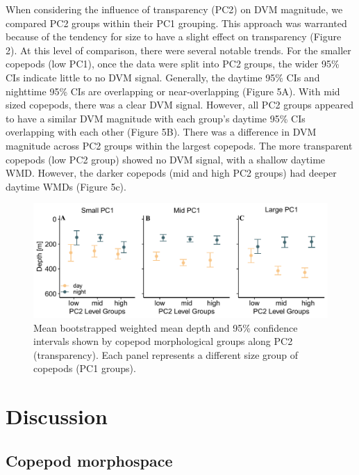 \documentclass[
]{article}
\begin{document}
When considering the influence of transparency (PC2) on DVM magnitude,
we compared PC2 groups within their PC1 grouping. This approach was
warranted because of the tendency for size to have a slight effect on
transparency (Figure 2). At this level of comparison, there were several
notable trends. For the smaller copepods (low PC1), once the data were
split into PC2 groups, the wider 95\% CIs indicate little to no DVM
signal. Generally, the daytime 95\% CIs and nighttime 95\% CIs are
overlapping or near-overlapping (Figure 5A). With mid sized copepods,
there was a clear DVM signal. However, all PC2 groups appeared to have a
similar DVM magnitude with each group's daytime 95\% CIs overlapping
with each other (Figure 5B). There was a difference in DVM magnitude
across PC2 groups within the largest copepods. The more transparent
copepods (low PC2 group) showed no DVM signal, with a shallow daytime
WMD. However, the darker copepods (mid and high PC2 groups) had deeper
daytime WMDs (Figure 5c).

\begin{figure}

{\centering \includegraphics{../media/figure_05.pdf}

}

\caption{Mean bootstrapped weighted mean depth and 95\% confidence
intervals shown by copepod morphological groups along PC2
(transparency). Each panel represents a different size group of copepods
(PC1 groups).}

\end{figure}

\hypertarget{discussion}{%
\section{Discussion}\label{discussion}}

\hypertarget{copepod-morphospace}{%
\subsection{Copepod morphospace}\label{copepod-morphospace}}
\end{document}
